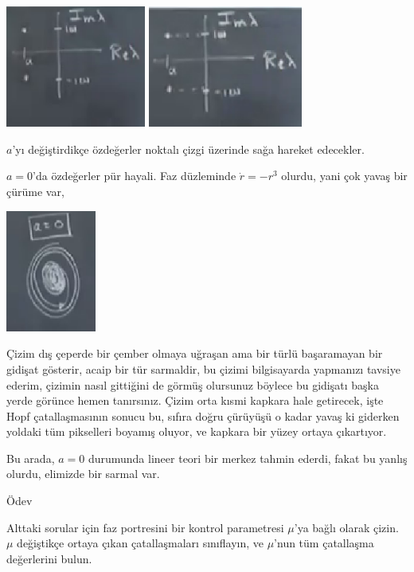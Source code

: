 \documentclass[12pt,fleqn]{article}\usepackage{../../common}
\begin{document}
\includegraphics[height=4cm]{12_24.png}
\includegraphics[height=4cm]{12_25.png}

$a$'yı değiştirdikçe özdeğerler noktalı çizgi üzerinde sağa hareket edecekler. 

$a=0$'da özdeğerler pür hayali. Faz düzleminde $\dot{r}=-r^3$ olurdu, yani çok
yavaş bir çürüme var, 

\includegraphics[height=4cm]{12_26.png}

Çizim dış çeperde bir çember olmaya uğraşan ama bir türlü başaramayan bir
gidişat gösterir, acaip bir tür sarmaldir, bu çizimi bilgisayarda yapmanızı
tavsiye ederim, çizimin nasıl gittiğini de görmüş olursunuz böylece bu gidişatı
başka yerde görünce hemen tanırsınız. Çizim orta kısmi kapkara hale getirecek,
işte Hopf çatallaşmasının sonucu bu, sıfıra doğru çürüyüşü o kadar yavaş ki
giderken yoldaki tüm pikselleri boyamış oluyor, ve kapkara bir yüzey ortaya
çıkartıyor. 

Bu arada, $a=0$ durumunda lineer teori bir merkez tahmin ederdi, fakat bu yanlış
olurdu, elimizde bir sarmal var. 

Ödev

Alttaki sorular için faz portresini bir kontrol parametresi $\mu$'ya bağlı
olarak çizin. $\mu$ değiştikçe ortaya çıkan çatallaşmaları sınıflayın, ve
$\mu$'nun tüm çatallaşma değerlerini bulun. 
\end{document}
